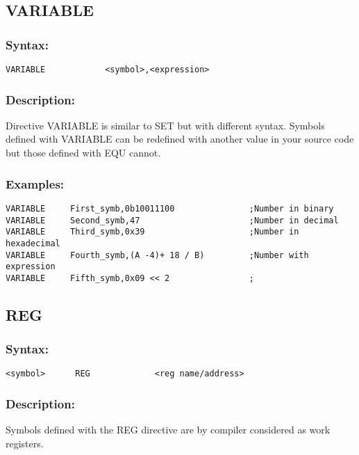     \subsection{VARIABLE}
        \subsubsection{Syntax:}
            {
                \usecodefont
                \verb'VARIABLE            <symbol>,<expression>'
            }

        \subsubsection{Description:}
            Directive VARIABLE is similar to SET but with different syntax. Symbols defined with VARIABLE can be redefined with another value in your source code but those defined with EQU cannot.

        \subsubsection{Examples:}
            {
                \usecodefont
                \verb'VARIABLE     First_symb,0b10011100               ;Number in binary'\\
                \verb'VARIABLE     Second_symb,47                      ;Number in decimal'\\
                \verb'VARIABLE     Third_symb,0x39                     ;Number in hexadecimal'\\
                \verb'VARIABLE     Fourth_symb,(A -4)+ 18 / B)         ;Number with expression'\\
                \verb'VARIABLE     Fifth_symb,0x09 << 2                ;'\\
            }

    \subsection{REG}
        \subsubsection{Syntax:}
            {
                \usecodefont
                \verb'<symbol>      REG             <reg name/address>'
            }

        \subsubsection{Description:}
            Symbols defined with the REG directive are by compiler considered as work registers.

